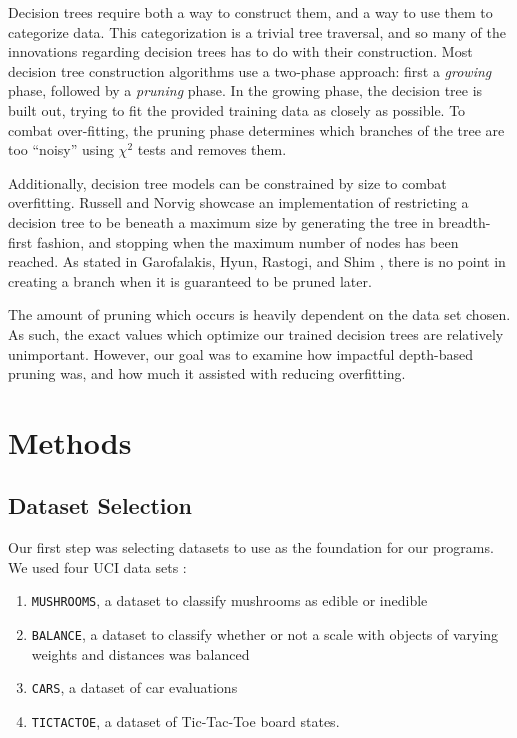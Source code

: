 \documentclass[screen, authorversion, nonacm, sigconf]{acmart}
\begin{document}
Decision trees require both a way to construct them, and a way to use them to categorize data. This categorization is a trivial tree traversal, and so many of the innovations regarding decision trees has to do with their construction. Most decision tree construction algorithms use a two-phase approach: first a \emph{growing} phase, followed by a \emph{pruning} phase. In the growing phase, the decision tree is built out, trying to fit the provided training data as closely as possible. To combat over-fitting, the pruning phase determines which branches of the tree are too ``noisy'' using $\chi^2$ tests and removes them.

Additionally, decision tree models can be constrained by size to combat overfitting. Russell and Norvig \cite{russell_norvig_2010} showcase an implementation of restricting a decision tree to be beneath a maximum size by generating the tree in breadth-first fashion, and stopping when the maximum number of nodes has been reached. As stated in Garofalakis, Hyun, Rastogi, and Shim \cite{Garofalakis:2000:EAC:347090.347163}, there is no point in creating a branch when it is guaranteed to be pruned later.

The amount of pruning which occurs is heavily dependent on the data set chosen. As such, the exact values which optimize our trained decision trees are relatively unimportant. However, our goal was to examine how impactful depth-based pruning was, and how much it assisted with reducing overfitting.

\section{Methods}

\subsection{Dataset Selection}

Our first step was selecting datasets to use as the foundation for our programs. We used four UCI data sets \cite{Dua:2019}:

\begin{enumerate}
  \item \texttt{MUSHROOMS}, a dataset to classify mushrooms as edible or inedible
  \item \texttt{BALANCE}, a dataset to classify whether or not a scale with objects of varying weights and distances was balanced
  \item \texttt{CARS}, a dataset of car evaluations
  \item \texttt{TICTACTOE}, a dataset of Tic-Tac-Toe board states.
\end{enumerate}
\end{document}
